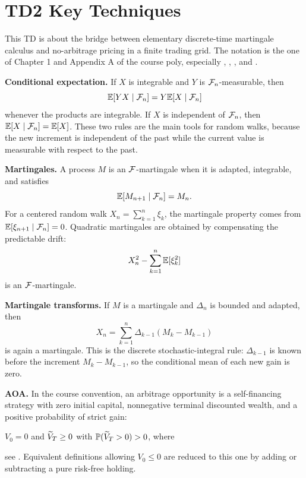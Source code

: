 \section{TD2 Key Techniques}

This TD is about the bridge between elementary discrete-time martingale
calculus and no-arbitrage pricing in a finite trading grid.  The notation is
the one of Chapter 1 and Appendix A of the course poly, especially
, , , and
.

\begin{techniques}
  \item \textbf{Conditional expectation.}  If \(X\) is integrable and
  \(Y\) is \(\mathcal{F}_n\)-measurable, then
  \[
    \mathbb{E}[YX\mid \mathcal{F}_n]=Y\mathbb{E}[X\mid \mathcal{F}_n]
  \]
  whenever the products are integrable.  If \(X\) is independent of
  \(\mathcal{F}_n\), then \(\mathbb{E}[X\mid \mathcal{F}_n]=\mathbb{E}[X]\).  These two rules are the main
  tools for random walks, because the new increment is independent of the
  past while the current value is measurable with respect to the past.

  \item \textbf{Martingales.}  A process \(M\) is an \(\mathcal{F}\)-martingale when
  it is adapted, integrable, and satisfies
  \[
    \mathbb{E}[M_{n+1}\mid \mathcal{F}_n]=M_n .
  \]
  For a centered random walk \(X_n=\sum_{k=1}^n \xi_k\), the martingale
  property comes from
  \(\mathbb{E}[\xi_{n+1}\mid \mathcal{F}_n]=0\).  Quadratic martingales are obtained by
  compensating the predictable drift:
  \[
    X_n^2-\sum_{k=1}^n \mathbb{E}[\xi_k^2]
  \]
  is an \(\mathcal{F}\)-martingale.

  \item \textbf{Martingale transforms.}  If \(M\) is a martingale and
  \(\Delta_n\) is bounded and adapted, then
  \[
    X_n=\sum_{k=1}^n \Delta_{k-1}(M_k-M_{k-1})
  \]
  is again a martingale.  This is the discrete stochastic-integral rule:
  \(\Delta_{k-1}\) is known before the increment \(M_k-M_{k-1}\), so the
  conditional mean of each new gain is zero.

  \item \textbf{AOA.}  In the course convention, an arbitrage opportunity is
  a self-financing strategy with zero initial capital, nonnegative terminal
  discounted wealth, and a positive probability of strict gain:
  
  \(V_0=0\) and \(\widetilde V_T\ge 0\) with \(\mathbb{P}(\widetilde V_T>0)>0\), where 
  
  see .  Equivalent definitions allowing \(V_0\le 0\) are
  reduced to this one by adding or subtracting a pure risk-free holding.


\end{techniques}
